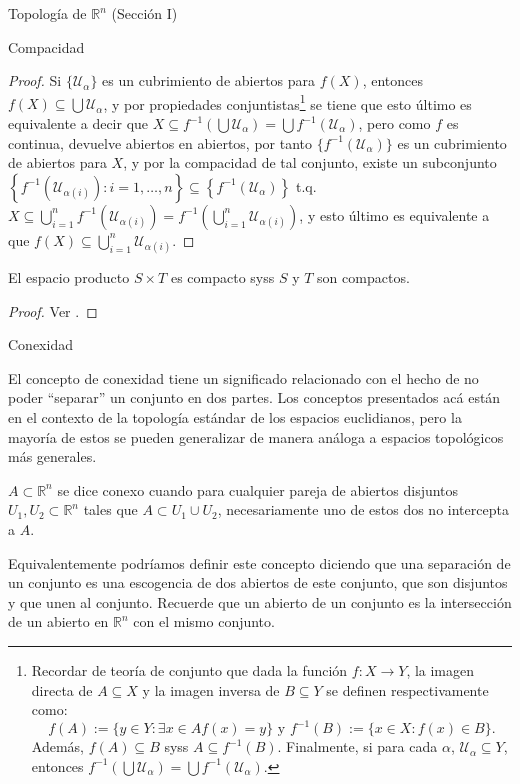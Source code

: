 \begin{chapter}{Topología de $\mathbb{R}^n$ (Sección I)}
\begin{section}{Compacidad}
\begin{proof}
Si $\{\mathcal{U}_\alpha\}$ es un cubrimiento de abiertos para $f(X)$, entonces $f(X)\subseteq\bigcup\mathcal{U}_\alpha$, y por propiedades conjuntistas\footnote{Recordar de teoría de conjunto que dada la función $f:X\to Y$, la imagen directa de $A\subseteq X$ y la imagen inversa de $B\subseteq Y$ se definen respectivamente como:$$f(A):=\{y\in Y:\exists x\in A f(x)=y\}\text{ y }f^{-1}(B):=\{x\in X:f(x)\in B\}.$$ Además, $f(A)\subseteq B$ syss $A\subseteq f^{-1}(B)$. Finalmente, si para cada $\alpha$, $\mathcal{U}_\alpha\subseteq Y$, entonces $f^{-1}\left(\bigcup\mathcal{U}_\alpha\right)=\bigcup f^{-1}\left(\mathcal{U}_\alpha\right)$.} se tiene que esto último es equivalente a decir que $X\subseteq f^{-1}\left(\bigcup\mathcal{U}_\alpha\right)=\bigcup f^{-1}(\mathcal{U}_\alpha)$, pero como $f$ es continua, devuelve abiertos en abiertos, por tanto $\{f^{-1}(\mathcal{U}_\alpha)\}$ es un cubrimiento de abiertos para $X$, y por la compacidad de tal conjunto, existe un subconjunto $\left\lbrace f^{-1}(\mathcal{U}_{\alpha(i)}):i=1,\ldots,n\right\rbrace\subseteq\left\lbrace f^{-1}\left(\mathcal{U}_\alpha\right)\right\rbrace$ t.q. $X\subseteq\bigcup_{i=1}^nf^{-1}\left(\mathcal{U}_{\alpha(i)}\right)=f^{-1}\left(\bigcup_{i=1}^n\mathcal{U}_{\alpha(i)}\right)$, y esto último es equivalente a que $f(X)\subseteq\bigcup_{i=1}^n\mathcal{U}_{\alpha(i)}$.
\end{proof}

\begin{them}
El espacio producto $S\times T$ es compacto syss $S$ y $T$ son compactos. 
\end{them}

\begin{proof}
Ver \cite[pp. 24, 25]{abraham}.
\end{proof}

\end{section}

\begin{section}{Conexidad}

El concepto de conexidad tiene un significado relacionado con el hecho de no poder ``separar'' un conjunto en dos partes. Los conceptos presentados acá están en el contexto de la topología estándar de los espacios euclidianos, pero la mayoría de estos se pueden generalizar de manera análoga a espacios topológicos más generales.

\begin{defn}
$A \subset \mathbb{R}^n$ se dice conexo cuando para cualquier pareja de abiertos disjuntos $U_1, U_2 \subset \mathbb{R}^n$ tales que $A \subset U_1 \cup U_2$, necesariamente uno de estos dos no intercepta a $A$.
\end{defn}
Equivalentemente podríamos definir este concepto diciendo que una separación de un conjunto es una escogencia de dos abiertos de este conjunto, que son disjuntos y que unen al conjunto. Recuerde que un abierto de un conjunto es la intersección de un abierto en $\mathbb{R}^n$ con el mismo conjunto.


\end{section}
\end{chapter}
